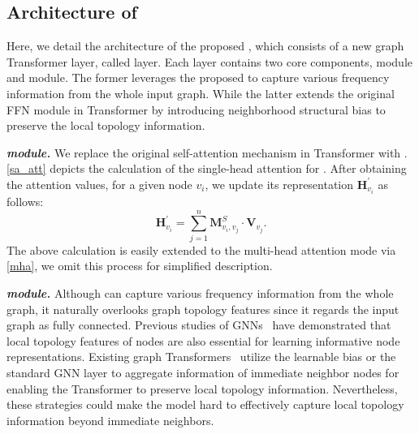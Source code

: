 \documentclass[sigconf, screen]{acmart}
\begin{document}
\subsection{Architecture of \name}
Here, we detail the architecture of the proposed \name, which consists of a new graph Transformer layer, called \name layer.
Each \name layer contains two core components, \saname module and \sffn module.
The former leverages the proposed \saname to capture various frequency information from the whole input graph.
While the latter extends the original FFN module in Transformer by introducing neighborhood structural bias to preserve the local topology information.

\textit{\textbf{\saname module.}}
We replace the original self-attention mechanism in Transformer with \saname.
\autoref{sa_att} depicts the calculation of the single-head attention for \saname.
After obtaining the attention values, for a given node $v_i$, we update its representation $\mathbf{H}_{v_i}^{\prime}$ as follows:
\begin{equation}
    \mathbf{H}_{v_i}^{\prime} = \sum_{j=1}^{n} \mathbf{M}_{v_i, v_j}^{S} \cdot \mathbf{V}_{v_j}.
    \label{agg_sum}
\end{equation}
The above calculation is easily extended to the multi-head attention mode via \autoref{mha}, we omit this process for simplified description.

\textit{\textbf{\sffn module.}}
Although \saname can capture various frequency information from the whole graph, it naturally overlooks graph topology features since it regards the input graph as fully connected.
Previous studies of GNNs~\cite{fagcn,gprgnn,gcn,gdc} have  demonstrated that local topology features of nodes are also essential for learning informative node representations. 
Existing graph Transformers~\cite{nodeformer,gps,sat} utilize the learnable bias or the standard GNN layer to aggregate information of immediate neighbor nodes for enabling the Transformer to preserve local topology information.
Nevertheless, these strategies could make the model hard to effectively capture local topology information beyond immediate neighbors.
\end{document}
